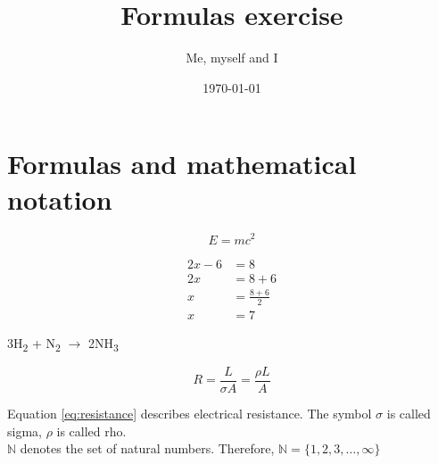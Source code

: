 \documentclass[a4paper]{article}
\title{Formulas exercise}
\author{Me, myself and I}
\date{\today}
\begin{document}
\maketitle
	


\section*{Formulas and mathematical notation}
\begin{equation*}
    E = mc^2
\end{equation*}


\begin{align*} 
2x - 6 &=  8 \\ 
2x &=  8 + 6\\
x  &= \frac{8 + 6}{2}\\
x &= 7
\end{align*}

\begin{center}
\noindent 3H\textsubscript{2} + N\textsubscript{2} $\rightarrow$ 2NH\textsubscript{3}      
\end{center}
    




\begin{equation}
    R = \frac{L}{{\sigma A}} = \frac{{\rho L}}{A}
    \label{eq:resistance}
\end{equation}	

\noindent Equation \ref{eq:resistance} describes electrical resistance. The symbol $\sigma$ is called sigma, $\rho$ is called rho.\\

\noindent $\mathbb{N}$ denotes the set of natural numbers. Therefore, $ \mathbb{N}=\{1,2,3,\ldots,\infty\} $



		
\end{document}
